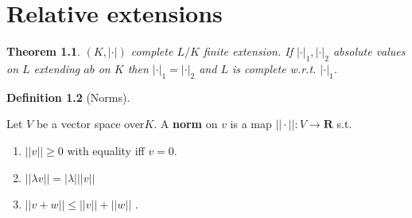 \documentclass[10pt,]{book}
\newcommand{\terminology}[1]{\textbf{#1}}
\theoremstyle{plain}
\newtheorem{theorem}{Theorem}[section]
\theoremstyle{definition}
\newtheorem{definition}[theorem]{Definition}
\newcommand{\RR}{\mathbf{R}}
\newcommand{\ab}{|\cdot|}
\begin{document}
\chapter[Relative extensions]{Relative extensions}\label{chap-relative}
\begin{theorem}\label{theorem-7}
\((K,\ab)\) complete \(L/K\) finite extension.
          If \(\ab_1,\ab_2\) absolute values on \(L\) extending \(ab\) on \(K\) then \(\ab_1=\ab_2\) and \(L\) is complete w.r.t. \(\ab_1\).
        \end{theorem}
\begin{definition}[Norms]\label{definition-10}

          Let \(V\) be a vector space over\(K\).
          A \terminology{norm} on \(v\) is a map \(||\cdot||\colon V \to \RR\) s.t.
          \begin{enumerate}
\item{}\(||v|| \ge 0\) with equality iff \(v = 0\).\item{}\(||\lambda v|| = |\lambda| ||v||\)\item{} \(||v+w|| \le ||v|| + ||w||\) .\end{enumerate}
\end{definition}
%
\backmatter
%
\end{document}
